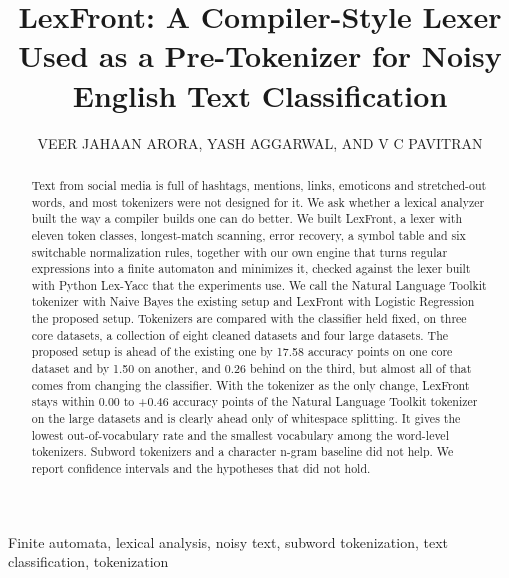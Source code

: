 \documentclass{ieeeaccess}
\begin{document}
\title{LexFront: A Compiler-Style Lexer Used as a Pre-Tokenizer for Noisy English Text Classification}
\author{\uppercase{Veer Jahaan Arora}, \uppercase{Yash Aggarwal}, AND \uppercase{V C Pavitran}}
\address[1]{School of Computer Science and Engineering (SCOPE), Vellore Institute of Technology (VIT), Vellore, India (e-mail: [to be added])}
\begin{abstract}
Text from social media is full of hashtags, mentions, links, emoticons and stretched-out words, and most tokenizers were not designed for it. We ask whether a lexical analyzer built the way a compiler builds one can do better. We built LexFront, a lexer with eleven token classes, longest-match scanning, error recovery, a symbol table and six switchable normalization rules, together with our own engine that turns regular expressions into a finite automaton and minimizes it, checked against the lexer built with Python Lex-Yacc that the experiments use. We call the Natural Language Toolkit tokenizer with Naive Bayes the existing setup and LexFront with Logistic Regression the proposed setup. Tokenizers are compared with the classifier held fixed, on three core datasets, a collection of eight cleaned datasets and four large datasets. The proposed setup is ahead of the existing one by 17.58 accuracy points on one core dataset and by 1.50 on another, and 0.26 behind on the third, but almost all of that comes from changing the classifier. With the tokenizer as the only change, LexFront stays within 0.00 to +0.46 accuracy points of the Natural Language Toolkit tokenizer on the large datasets and is clearly ahead only of whitespace splitting. It gives the lowest out-of-vocabulary rate and the smallest vocabulary among the word-level tokenizers. Subword tokenizers and a character n-gram baseline did not help. We report confidence intervals and the hypotheses that did not hold.
\end{abstract}
\begin{keywords}
Finite automata, lexical analysis, noisy text, subword tokenization, text classification, tokenization
\end{keywords}
\titlepgskip=-21pt
\maketitle
\end{document}
